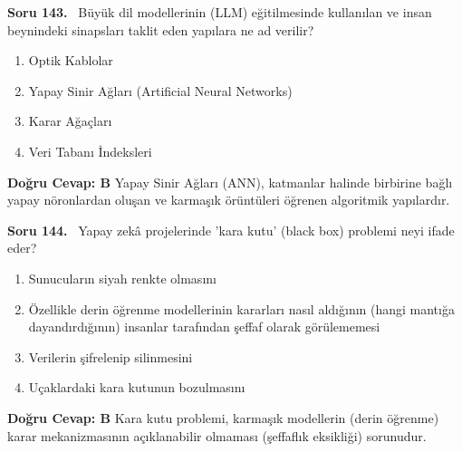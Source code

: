\documentclass[11pt,a4paper,openany]{book}
\begin{document}
\needspace{5cm}
\vspace{8pt}
\noindent\textbf{\large\sffamily Soru 143.} \ Büyük dil modellerinin (LLM) eğitilmesinde kullanılan ve insan beynindeki sinapsları taklit eden yapılara ne ad verilir?
\begin{enumerate}[label=\Alph*), leftmargin=25pt, topsep=4pt, itemsep=2pt]
    \item Optik Kablolar
    \item Yapay Sinir Ağları (Artificial Neural Networks)
    \item Karar Ağaçları
    \item Veri Tabanı İndeksleri
\end{enumerate}
\vspace{4pt}
\begin{tcolorbox}[title=Cevap ve Açıklama, colback=gray!3!white, colframe=primarycolor!90!black, arc=2mm, fonttitle=\bfseries\sffamily, top=6pt, bottom=6pt]
    \textbf{Doğru Cevap: B}
    \vspace{2pt}
    Yapay Sinir Ağları (ANN), katmanlar halinde birbirine bağlı yapay nöronlardan oluşan ve karmaşık örüntüleri öğrenen algoritmik yapılardır.
\end{tcolorbox}
\vspace{10pt}

\needspace{5cm}
\vspace{8pt}
\noindent\textbf{\large\sffamily Soru 144.} \ Yapay zekâ projelerinde 'kara kutu' (black box) problemi neyi ifade eder?
\begin{enumerate}[label=\Alph*), leftmargin=25pt, topsep=4pt, itemsep=2pt]
    \item Sunucuların siyah renkte olmasını
    \item Özellikle derin öğrenme modellerinin kararları nasıl aldığının (hangi mantığa dayandırdığının) insanlar tarafından şeffaf olarak görülememesi
    \item Verilerin şifrelenip silinmesini
    \item Uçaklardaki kara kutunun bozulmasını
\end{enumerate}
\vspace{4pt}
\begin{tcolorbox}[title=Cevap ve Açıklama, colback=gray!3!white, colframe=primarycolor!90!black, arc=2mm, fonttitle=\bfseries\sffamily, top=6pt, bottom=6pt]
    \textbf{Doğru Cevap: B}
    \vspace{2pt}
    Kara kutu problemi, karmaşık modellerin (derin öğrenme) karar mekanizmasının açıklanabilir olmaması (şeffaflık eksikliği) sorunudur.
\end{tcolorbox}
\vspace{10pt}
\end{document}

